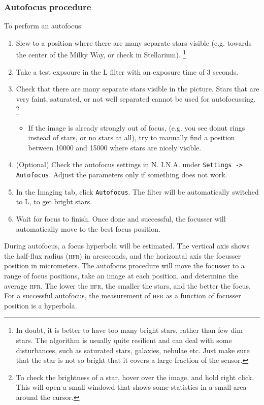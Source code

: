 \documentclass[a4paper, 11pt, fleqn]{memoir}
\begin{document}
\subsubsection*{Autofocus procedure}
To perform an autofocus:

\begin{enumerate}
    \item Slew to a position where there are many separate stars visible (e.g. towards the center of the Milky Way, or check in Stellarium).
          \footnote{In doubt, it is better to have too many bright stars, rather than few
              dim stars.
              The algorithm is usually quite resilient and can deal with some disturbances, such as saturated stars, galaxies, nebulae etc. Just make sure that the star is not so bright that it covers a large fraction of the sensor.
          }
    \item
          Take a test expsoure in the L filter with an exposure time of 3 seconds.
    \item
          Check that there are many separate stars visible in the picture.
          Stars that are very faint, saturated, or not well separated cannot be used for autofocussing.
          \footnote{To check the brightness of a star, hover over the image, and hold right click.
              This will open a small windowd that shows some statistics in a small area around the cursor.
          }
          \begin{itemize}
              \item
                    If the image is already strongly out of focus, (e.g. you see donut rings instead of stars, or no stars at all), try to manually find a position between 10000 and 15000 where stars are nicely visible.
          \end{itemize}
    \item
          (Optional) Check the autofocus settings in N.
          I.N.A.
          under \texttt{Settings -> Autofocus}.
          Adjust the parameters only if something does not work.
    \item
          In the Imaging tab, click \texttt{Autofocus}.
          The filter will be automatically switched to L, to get bright stars.
    \item
          Wait for focus to finish.
          Once done and successful, the focusser will automatically move to the best focus position.
\end{enumerate}

During autofocus, a focus hyperbola will be estimated.
The vertical axis shows the half-flux radius (\textsc{hfr}) in arcseconds, and the horizontal axis the focusser position in micrometers.
The autofocus procedure will move the focusser to a range of focus positions, take an image at each position, and determine the average \textsc{hfr}.
The lower the \textsc{hfr}, the smaller the stars, and the better the focus.
For a successful autofocus, the measurement of \textsc{hfr} as a function of focusser position is a hyperbola.
\end{document}
